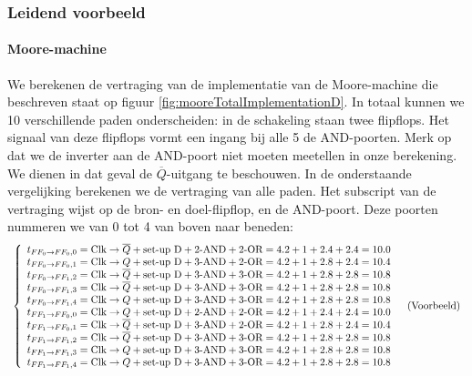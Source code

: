 \subsubsection{Leidend voorbeeld}
\paragraph{Moore-machine}
We berekenen de vertraging van de implementatie van de Moore-machine die beschreven staat op figuur \ref{fig:mooreTotalImplementationD}. In totaal kunnen we 10 verschillende paden onderscheiden: in de schakeling staan twee flipflops. Het signaal van deze flipflops vormt een ingang bij alle 5 de AND-poorten. Merk op dat we de inverter aan de AND-poort niet moeten meetellen in onze berekening. We dienen in dat geval de $\overline{Q}$-uitgang te beschouwen. In de onderstaande vergelijking berekenen we de vertraging van alle paden. Het subscript van de vertraging wijst op de bron- en doel-flipflop, en de AND-poort. Deze poorten nummeren we van 0 tot 4 van boven naar beneden:
\begin{equation}
\begin{array}{ll}
\left\{\begin{array}{l}
t_{\small{FF_0\rightarrow FF_0,0}}=\mbox{Clk}\rightarrow \overline{Q}+\mbox{set-up D}+\mbox{2-AND}+\mbox{2-OR}=4.2+1+2.4+2.4=10.0\\
t_{\small{FF_0\rightarrow FF_0,1}}=\mbox{Clk}\rightarrow Q+\mbox{set-up D}+\mbox{3-AND}+\mbox{2-OR}=4.2+1+2.8+2.4=10.4\\
t_{\small{FF_0\rightarrow FF_1,2}}=\mbox{Clk}\rightarrow \overline{Q}+\mbox{set-up D}+\mbox{3-AND}+\mbox{3-OR}=4.2+1+2.8+2.8=10.8\\
t_{\small{FF_0\rightarrow FF_1,3}}=\mbox{Clk}\rightarrow \overline{Q}+\mbox{set-up D}+\mbox{3-AND}+\mbox{3-OR}=4.2+1+2.8+2.8=10.8\\
t_{\small{FF_0\rightarrow FF_1,4}}=\mbox{Clk}\rightarrow Q+\mbox{set-up D}+\mbox{3-AND}+\mbox{3-OR}=4.2+1+2.8+2.8=10.8\\

t_{\small{FF_1\rightarrow FF_0,0}}=\mbox{Clk}\rightarrow Q+\mbox{set-up D}+\mbox{2-AND}+\mbox{2-OR}=4.2+1+2.4+2.4=10.0\\
t_{\small{FF_1\rightarrow FF_0,1}}=\mbox{Clk}\rightarrow \overline{Q}+\mbox{set-up D}+\mbox{3-AND}+\mbox{2-OR}=4.2+1+2.8+2.4=10.4\\
t_{\small{FF_1\rightarrow FF_1,2}}=\mbox{Clk}\rightarrow \overline{Q}+\mbox{set-up D}+\mbox{3-AND}+\mbox{3-OR}=4.2+1+2.8+2.8=10.8\\
t_{\small{FF_1\rightarrow FF_1,3}}=\mbox{Clk}\rightarrow Q+\mbox{set-up D}+\mbox{3-AND}+\mbox{3-OR}=4.2+1+2.8+2.8=10.8\\
t_{\small{FF_1\rightarrow FF_1,4}}=\mbox{Clk}\rightarrow Q+\mbox{set-up D}+\mbox{3-AND}+\mbox{3-OR}=4.2+1+2.8+2.8=10.8
\end{array}\right.&\mbox{(Voorbeeld)}
\end{array}
\end{equation}
